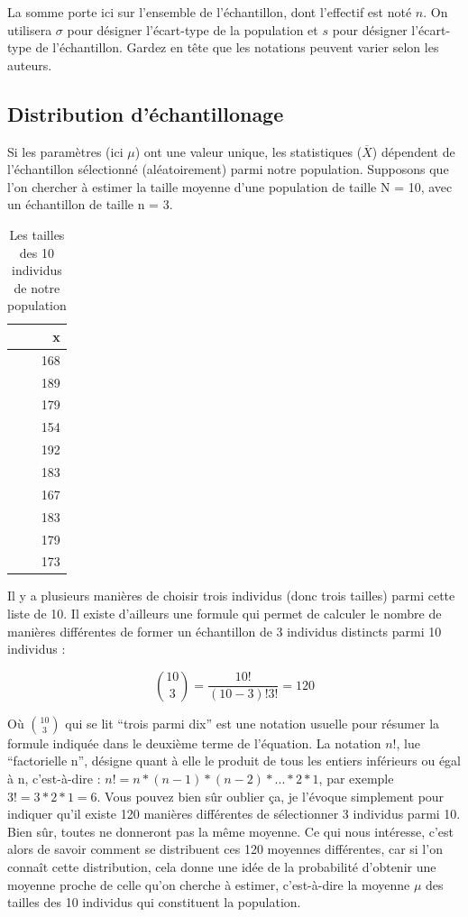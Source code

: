 \documentclass[
]{book}
\begin{document}
La somme porte ici sur l'ensemble de l'échantillon, dont l'effectif est noté \(n\). On utilisera \(\sigma\) pour désigner l'écart-type de la population et \(s\) pour désigner l'écart-type de l'échantillon. Gardez en tête que les notations peuvent varier selon les auteurs.

\hypertarget{distribution-duxe9chantillonage}{%
\subsection{Distribution d'échantillonage}\label{distribution-duxe9chantillonage}}

Si les paramètres (ici \(\mu\)) ont une valeur unique, les statistiques (\(\overline{X}\)) dépendent de l'échantillon sélectionné (aléatoirement) parmi notre population. Supposons que l'on chercher à estimer la taille moyenne d'une population de taille N = 10, avec un échantillon de taille n = 3.

\begin{table}

\caption{\label{tab:unnamed-chunk-28}Les tailles des 10 individus de notre population}
\centering
\begin{tabular}[t]{r}
\hline
x\\
\hline
168\\
\hline
189\\
\hline
179\\
\hline
154\\
\hline
192\\
\hline
183\\
\hline
167\\
\hline
183\\
\hline
179\\
\hline
173\\
\hline
\end{tabular}
\end{table}

Il y a plusieurs manières de choisir trois individus (donc trois tailles) parmi cette liste de 10. Il existe d'ailleurs une formule qui permet de calculer le nombre de manières différentes de former un échantillon de 3 individus distincts parmi 10 individus :

\[{\binom{10}{3}} = \frac{10!}{(10-3)!3!} = 120\]

Où \(\binom{10}{3}\) qui se lit ``trois parmi dix'' est une notation usuelle pour résumer la formule indiquée dans le deuxième terme de l'équation. La notation \(n!\), lue ``factorielle n'', désigne quant à elle le produit de tous les entiers inférieurs ou égal à n, c'est-à-dire : \(n! = n*(n-1)*(n-2)*...*2*1\), par exemple \(3! = 3*2*1 = 6\). Vous pouvez bien sûr oublier ça, je l'évoque simplement pour indiquer qu'il existe 120 manières différentes de sélectionner 3 individus parmi 10. Bien sûr, toutes ne donneront pas la même moyenne. Ce qui nous intéresse, c'est alors de savoir comment se distribuent ces 120 moyennes différentes, car si l'on connaît cette distribution, cela donne une idée de la probabilité d'obtenir une moyenne proche de celle qu'on cherche à estimer, c'est-à-dire la moyenne \(\mu\) des tailles des 10 individus qui constituent la population.
\end{document}
